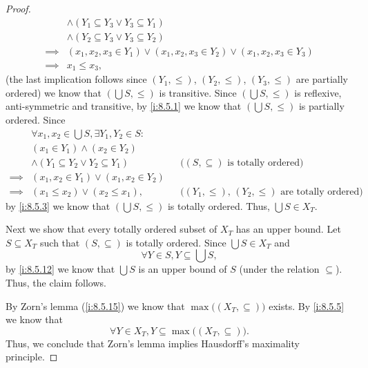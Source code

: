 \begin{proof}
\begin{align*}
             & \land (Y_1 \subseteq Y_3 \lor Y_3 \subseteq Y_1)                                                                                      \\
             & \land (Y_2 \subseteq Y_3 \lor Y_3 \subseteq Y_2)                                                                                      \\
    \implies & (x_1, x_2, x_3 \in Y_1) \lor (x_1, x_2, x_3 \in Y_2) \lor (x_1, x_2, x_3 \in Y_3)                                                     \\
    \implies & x_1 \leq x_3,
  \end{align*}
  (the last implication follows since \((Y_1, \leq)\), \((Y_2, \leq)\), \((Y_3, \leq)\) are partially ordered)
  we know that \((\bigcup S, \leq)\) is transitive.
  Since \((\bigcup S, \leq)\) is reflexive, anti-symmetric and transitive, by \cref{i:8.5.1} we know that \((\bigcup S, \leq)\) is partially ordered.
  Since
  \begin{align*}
             & \forall x_1, x_2 \in \bigcup S, \exists Y_1, Y_2 \in S :                                                                    \\
             & (x_1 \in Y_1) \land (x_2 \in Y_2)                                                                                           \\
             & \land (Y_1 \subseteq Y_2 \lor Y_2 \subseteq Y_1)         &  & \text{(\((S, \subseteq)\) is totally ordered)}                \\
    \implies & (x_1, x_2 \in Y_1) \lor (x_1, x_2 \in Y_2)                                                                                  \\
    \implies & (x_1 \leq x_2) \lor (x_2 \leq x_1),                      &  & \text{(\((Y_1, \leq)\), \((Y_2, \leq)\) are totally ordered)}
  \end{align*}
  by \cref{i:8.5.3} we know that \((\bigcup S, \leq)\) is totally ordered.
  Thus, \(\bigcup S \in X_T\).

  Next we show that every totally ordered subset of \(X_T\) has an upper bound.
  Let \(S \subseteq X_T\) such that \((S, \subseteq)\) is totally ordered.
  Since \(\bigcup S \in X_T\) and
  \[
    \forall Y \in S, Y \subseteq \bigcup S,
  \]
  by \cref{i:8.5.12} we know that \(\bigcup S\) is an upper bound of \(S\) (under the relation \(\subseteq\)).
  Thus, the claim follows.

  By Zorn's lemma (\cref{i:8.5.15}) we know that \(\max\big((X_T, \subseteq)\big)\) exists.
  By \cref{i:8.5.5} we know that
  \[
    \forall Y \in X_T, Y \subseteq \max\big((X_T, \subseteq)\big).
  \]
  Thus, we conclude that Zorn's lemma implies Hausdorff's maximality principle.


\end{proof}
